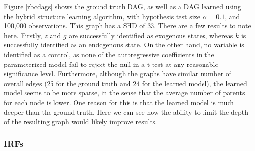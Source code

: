 \documentclass{article}
\begin{document}
Figure \ref{rbcdags} shows the ground truth DAG, as well as a DAG learned using the hybrid structure learning algorithm, with hypothesis test size $\alpha = 0.1$, and 100,000 observations. This graph has a SHD of 33. There are a few results to note here. Firstly, $z$ and $g$ are successfully identified as exogenous states, whereas $k$ is successfully identified as an endogenous state. On the other hand, no variable is identified as a control, as none of the autoregressive coefficients in the parameterized model fail to reject the null in a t-test at any reasonable significance level. Furthermore, although the graphs have similar number of overall edges (25 for the ground truth and 24 for the learned model), the learned model seems to be more sparse, in the sense that the average number of parents for each node is lower. One reason for this is that the learned model is much deeper than the ground truth. Here we can see how the ability to limit the depth of the resulting graph would likely improve results. 

\subsubsection{IRFs}
\end{document}
